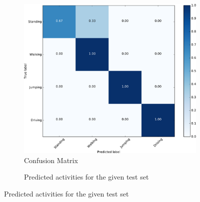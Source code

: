 \documentclass{article}
\begin{document}
\begin{figure}
		\vspace{-.5cm}
        \centering
        \begin{subfigure}[t]{0.9\linewidth}
                  \includegraphics[width=\textwidth,height=\textwidth]{figures/confusion_matrix}
                \caption{Confusion Matrix \label{fig:confusion}}
        \end{subfigure}%
        \vspace{.5cm}

        \begin{subfigure}[t]{0.44\textwidth}
                \hfil
                \vspace{-1cm}
                \caption{Predicted activities for the given test set \label{fig:test_set_labels}}
                \hfill
        \end{subfigure}%
\end{figure}
\end{document}
